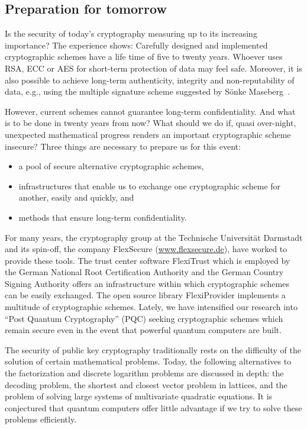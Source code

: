 \begin{bibunit}[babalpha]
\section{Preparation for tomorrow}
\label{sec:preparations}

Is the security of today's cryptography measuring
up to its increasing importance?  The experience
shows: Carefully designed and implemented
cryptographic schemes have a life time of five to
twenty years.  Whoever uses RSA, ECC or AES for
short-term protection of data may feel safe.
Moreover, it is also possible to achieve long-term
authenticity, integrity and non-reputability of
data, e.g., using the multiple signature scheme
suggested by S\"onke Maseberg~\cite{maseberg-thesis:2002}.

However, current schemes cannot guarantee
long-term confidentiality.  And what is to be done in
twenty years from now?  What should we do if, quasi
over-night, unexpected mathematical progress
renders an important cryptographic scheme
insecure?  Three things are necessary to prepare
us for this event:

\begin{itemize}
\item a pool of secure alternative cryptographic schemes,
\item infrastructures that enable us to exchange
   one cryptographic scheme for another, easily
   and quickly, and
\item methods that ensure long-term confidentiality.
\end{itemize}

For many years, the cryptography group at the
Technische Universit\"at Darmstadt and its spin-off,
the company FlexSecure (\url{www.flexsecure.de}),
have worked to provide these tools.  The
trust center software FlexiTrust which is employed
by the German National Root Certification
Authority and the German Country Signing Authority
offers an infrastructure within which
cryptographic schemes can be easily exchanged.
The open source library FlexiProvider implements a
multitude of cryptographic schemes.  Lately, we
have intensified our research into ``Post Quantum
Cryptography'' (PQC)
seeking cryptographic schemes which
remain secure even in the event that powerful
quantum computers are built.

The security of public key cryptography
traditionally rests on the difficulty of the
solution of certain mathematical problems.  Today,
the following alternatives to the factorization and discrete
logarithm problems are discussed in depth:  the
decoding problem, the shortest and closest vector
problem in lattices, and the problem of solving
large systems of multivariate quadratic
equations.  It is conjectured that quantum
computers offer little advantage if we try to
solve these problems efficiently.



\end{bibunit}
